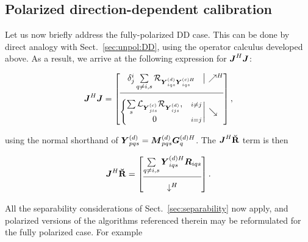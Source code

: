 \documentclass[useAMS,usenatbib]{mn2e}
\makeatletter
\newcommand{\mat}[1]{{\bmath{#1}}}
\newcommand{\JJ}{\mat{J}} %
\newcommand{\RR}{\mat{R}}
\newcommand{\JHJ}{\JJ^H\JJ} %
\newcommand{\Matrix}[2]{\left [ \begin{array}{@{}#1@{}}#2\end{array} \right ]}
\newcommand{\AUGx}[1]{\mathbf{\breve{#1}}}
\newcommand{\RRr}{\AUGx{R}}
\newcommand{\Rop}[1]{\mathcal{R}_{{#1}}}
\newcommand{\Lop}[1]{\mathcal{L}_{{#1}}}
\makeatother
\begin{document}


\subsection{Polarized direction-dependent calibration}

Let us now briefly address the fully-polarized DD case. This can be done by direct analogy with
Sect.~\ref{sec:unpol:DD}, using the operator calculus developed above. As a result, we arrive at the
following expression for $\JHJ$:

\begin{equation}
\label{eq:JHJ:DD:pol}
  \JHJ = \JHJblocks{
  \delta^i_j \sum\limits_{q\ne i,s} \Rop{\YYd_{iqs} \YYcH_{iqs}} 
  }{
  \left \{ 
  \begin{array}{@{}cc@{}}
   \sum\limits_{s} \Lop{ \YYc_{jis}  } \Rop{\YYd_{ijs}},&{\scriptstyle i\ne j} \\
   0 &{\scriptstyle i=j}
  \end{array} \right . 
  }
,
\end{equation}

using the normal shorthand of $\YYd_{pqs} = \MMd_{pqs} \GGdH_q$. The $\JJ^H\RRr$ term is then

\newcommand{\CCC}{\mathcal{C}}

\begin{equation}
\label{eq:JHR:DD:pol}
\JJ^H\RRr = \Matrix{c}{
\sum\limits_{q\ne i,s} \YYdH_{iqs} \RR_{iqs} \\
\hline\\[-8pt]
\downarrow^H}.
\end{equation}

All the separability considerations of Sect.~\ref{sec:separability} now apply, and polarized versions of the 
algorithms referenced therein may be reformulated for the fully polarized case. For example
\end{document}
